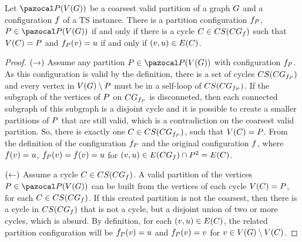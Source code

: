 \documentclass[msc,english,table,xcdraw]{ppgccufmg}
\begin{document}

\begin{lemma}
\label{lem:cycmap}
Let $\partitionFunc{\vertexFuncG}$ be a coarsest valid partition of a graph 
$G$ and a configuration $f$ of a TS instance.
There is a partition configuration $f_{P}$, $\partitionElem 
\in \partitionFunc{\vertexFuncG}$ if and only if there is a cycle $C \in 
CS(CG_{f})$ such that $V(C) 
= P$ and $f_{P}(v) = 
u$ if and only if $(v, u) \in E(C)$.
\end{lemma}

\begin{proof}
$(\rightarrow)$ Assume any partition $\partitionElem \in 
\partitionFunc{\vertexFuncG}$ with configuration $f_{P}$. 
As this configuration is valid by the definition, there is a 
set of cycles $CS(CG_{f_
{P}})$ and every vertex in
$V(G) \setminus P$ must be in a self-loop of $CS(CG_{f_{P}})$.
If the subgraph of the vertices of $P$ on $CG_{
f_{P}}$ is disconneted, then each connected subgraph of this
subgraph is a disjoint cycle and it is possible to create a smaller partitions 
of $P$ that are still valid, which is a contradiction on the 
coarsest valid partition.
So, there is exactly one $C \in CS(CG_
{f_{P}})$, such that $V(C) = P$.
From the definition of the configuration $f_{P}$ and the
original configuration $f$, where $f(v) = 
u$, $f_{P}(v) = f(v) = u$ for $(v, u) \in 
E(CG_{f}) \cap P^{2} = E(C)$. 

$(\leftarrow)$ Assume a cycle $C \in CS(CG_{f})$. 
A valid partition of the vertices $\partitionElem \in \partitionFunc
{\vertexFuncG}$ can be built from the vertices of each cycle $V(C) = P$, for each $C \in CS(CG_{f})$.
If this created partition is not the coarsest, then there is a cycle in 
$CS(CG_{f})$ that is not a cycle, but a
disjoint union of two or more cycles, which is absurd.
By definition, for each $(v, u) \in E(C)$, 
the related partition configuration will be $f_
{P}(v) = u$ and $f_
{P}(v) = v$ for $v \in V(G) \setminus 
V(C)$.
\end{proof}
\end{document}
